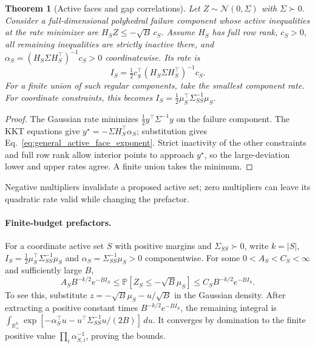 \documentclass[a4paper,onecolumn,unpublished,nopdfoutputerror]{quantumarticle}
\theoremstyle{plain}
\newtheorem{theorem}{Theorem}[section]
\theoremstyle{definition}
\newcommand{\Prob}{\mathbb{P}}
\newcommand{\calN}{\mathcal{N}}
\newcommand{\R}{\mathbb{R}}
\newcommand{\1}{\mathbf{1}}
\begin{document}
\begin{theorem}[Active faces and gap correlations]
\label{thm:diagonal_offdiagonal}
Let $Z\sim\calN(0,\Sigma)$ with $\Sigma\succ0$. Consider a full-dimensional polyhedral failure component whose active inequalities at the rate minimizer are $H_SZ\le-\sqrt B\,c_S$. Assume $H_S$ has full row rank, $c_S>0$, all remaining inequalities are strictly inactive there, and $\alpha_S=(H_S\Sigma H_S^\top)^{-1}c_S>0$ coordinatewise. Its rate is
\begin{equation}\label{eq:general_active_face_exponent}
I_S=\tfrac12c_S^\top(H_S\Sigma H_S^\top)^{-1}c_S.
\end{equation}
For a finite union of such regular components, take the smallest component rate. For coordinate constraints, this becomes $I_S=\tfrac12\mu_S^\top\Sigma_{SS}^{-1}\mu_S$.
\end{theorem}

\begin{proof}
The Gaussian rate minimizes $\tfrac12y^\top\Sigma^{-1}y$ on the failure component. The KKT equations give $y^\star=-\Sigma H_S^\top\alpha_S$; substitution gives Eq.~\eqref{eq:general_active_face_exponent}. Strict inactivity of the other constraints and full row rank allow interior points to approach $y^\star$, so the large-deviation lower and upper rates agree. A finite union takes the minimum.
\end{proof}

Negative multipliers invalidate a proposed active set; zero multipliers can leave its quadratic rate valid while changing the prefactor.

\paragraph{Finite-budget prefactors.}
For a coordinate active set $S$ with positive margins and $\Sigma_{SS}\succ0$, write $k=|S|$, $I_S=\tfrac12\mu_S^\top\Sigma_{SS}^{-1}\mu_S$ and $\alpha_S=\Sigma_{SS}^{-1}\mu_S>0$ componentwise. For some $0<A_S<C_S<\infty$ and sufficiently large $B$,
\begin{equation}\label{eq:regular_face_prefactor}
A_SB^{-k/2}e^{-BI_S}\le\Prob[Z_S\le-\sqrt B\mu_S]
\le C_SB^{-k/2}e^{-BI_S}.
\end{equation}
To see this, substitute $z=-\sqrt B\mu_S-u/\sqrt B$ in the Gaussian density. After extracting a positive constant times $B^{-k/2}e^{-BI_S}$, the remaining integral is $\int_{\R_+^k}\exp[-\alpha_S^\top u-u^\top\Sigma_{SS}^{-1}u/(2B)]\,du$. It converges by domination to the finite positive value $\prod_i\alpha_{S,i}^{-1}$, proving the bounds.
\end{document}
